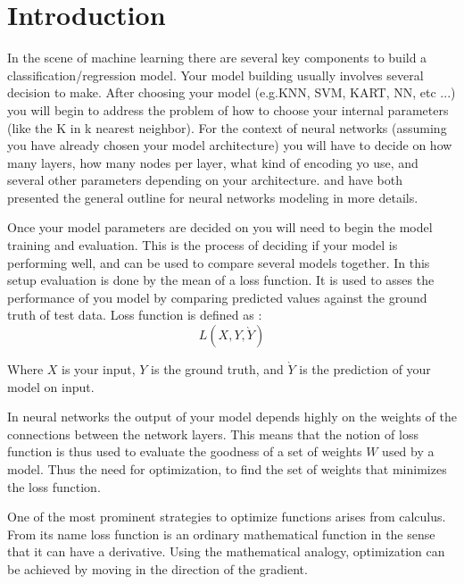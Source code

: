 \documentclass[12pt,twoside]{article}
\theoremstyle{plain}
\theoremstyle{definition}
\theoremstyle{remark}
\begin{document}


\section{Introduction}
\label{sec:introduction}
In the scene of machine learning there are several key components to build a classification/regression model. Your model building usually involves several decision to make.
After choosing your model (e.g.KNN,  SVM, KART, NN, etc ...) you will begin to address the problem of how to choose your internal parameters (like the K in k nearest neighbor). For the
context of neural networks (assuming you have already chosen your model architecture) you will have to decide on how many layers, how many nodes per layer, what kind of encoding yo use, and several other parameters depending on your architecture. \cite{Schmidhuber201585} and \cite{Arel2010} have both presented the general outline for neural networks modeling in more details.
\bigskip

Once your model parameters are decided on you will need to begin the model training and evaluation. This is the process of deciding if your model is performing well, and can be used to compare several models together. In this setup evaluation is done by the mean of a loss function. It is used to asses the performance of you model by comparing predicted values against the ground truth of test data. Loss function is defined as :
\begin{equation}
  L(X, Y, \grave{Y})
\end{equation}

Where $X$ is your input, $Y$ is the ground truth, and $\grave{Y}$ is the prediction of your model on input.
\bigskip

In neural networks the output of your model depends highly on the weights of the connections between the network layers. This means that the notion of loss function is thus used to evaluate the goodness of a set of weights $W$ used by a model. Thus the need for optimization, to find the set of weights
that minimizes the loss function.
\bigskip

One of the most prominent strategies to optimize functions arises from calculus. From its name loss function is an ordinary mathematical function in the sense that it can have a derivative. Using the mathematical analogy, optimization can be achieved by moving in the direction of the gradient.
\bigskip
\end{document}
